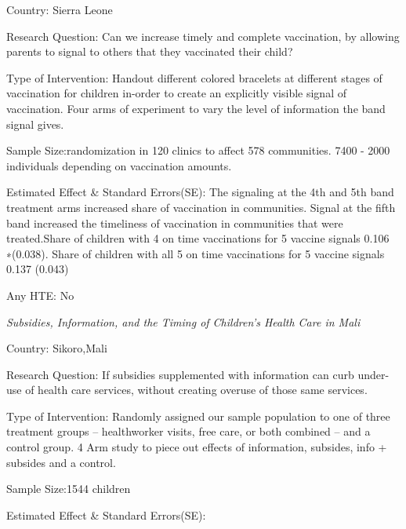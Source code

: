 \documentclass{article}
\begin{document}
\hfill

Country: Sierra Leone

\hfill

Research Question:
 Can we increase timely and complete vaccination, by allowing parents to signal to others that they vaccinated their child?


\hfill

Type of Intervention: Handout different colored bracelets at different stages of vaccination for children in-order to create an explicitly visible signal of vaccination. Four arms of experiment to vary the level of information the band signal gives.

\hfill

Sample Size:randomization in 120 clinics to affect 578 communities. 7400 - 2000 individuals depending on vaccination amounts.

\hfill

Estimated Effect \& Standard Errors(SE): 
The signaling at the 4th and 5th band treatment arms increased share of vaccination in communities.  Signal at the fifth band increased the timeliness of vaccination in communities that were treated.Share of children with 4 on time vaccinations for 5 vaccine signals 0.106 ∗(0.038).  Share of children with all 5 on time  vaccinations for 5 vaccine signals  0.137 (0.043) 

\hfill



\hfill

Any HTE: No

\textit{Subsidies, Information, and the Timing of Children’s Health Care in Mali
}


\hfill

Country: Sikoro,Mali

\hfill

Research Question:
 If subsidies supplemented with  information can curb under-use of health care services, without creating overuse of those same services.


\hfill

Type of Intervention: Randomly assigned our sample population to one of three treatment groups – healthworker visits, free care, or both combined – and a control group. 4 Arm study to piece out effects of information, subsides, info + subsides and a control.

\hfill

Sample Size:1544 children
\hfill

Estimated Effect \& Standard Errors(SE): 
\end{document}

